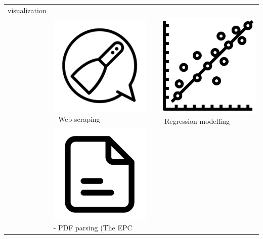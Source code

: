 \documentclass[
  letterpaper,
  DIV=11,
  numbers=noendperiod]{scrreprt}
\begin{document}
\begin{tcolorbox}
\begin{longtable}[]{@{}llll@{}}
visualization \\
& \includegraphics{assets/web_scraping_icon_2.png} - Web scraping & &
\includegraphics{assets/linear-regression_icon.png} - Regression
modelling \\
& \includegraphics{assets/pdf_text_icon.png} - PDF parsing (The EPC

\end{longtable}
\end{tcolorbox}
\end{document}
